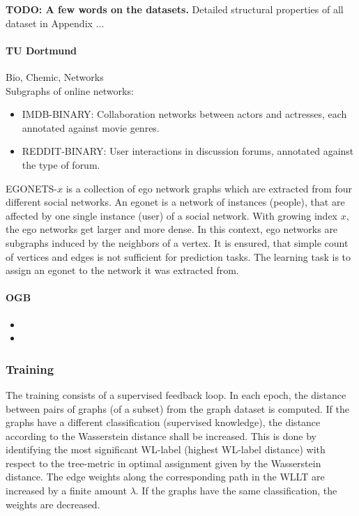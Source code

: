 \textbf{TODO: A few words on the datasets.} %
Detailed structural properties of all dataset in Appendix ... %
\paragraph{TU Dortmund} Bio, Chemic, Networks\\
Subgraphs of online networks:
\begin{itemize}
	\item IMDB-BINARY: Collaboration networks between actors and actresses, each annotated against movie genres.
	\item REDDIT-BINARY: User interactions in discussion forums, annotated against the type of forum.
\end{itemize}
EGONETS-$x$ is a collection of ego network graphs which are extracted from four different social networks. 
An egonet is a network of instances (people), that are affected by one single instance (user) of a social network.%
With growing index $x$, the ego networks get larger and more dense. 
In this context, ego networks are subgraphs induced by the neighbors of a vertex. 
It is ensured, that simple count of vertices and edges is not sufficient for prediction tasks. The learning task is to assign an egonet to the network it was extracted from.%

\paragraph{OGB} 
\begin{itemize}
	\item 
	\item 
\end{itemize}

\subsubsection{Training}

The training consists of a supervised feedback loop.
In each epoch, the distance between pairs of graphs (of a subset) from the graph dataset is computed. 
If the graphs have a different classification (supervised knowledge), the distance according to the Wasserstein distance shall be increased. 
This is done by identifying the most significant WL-label (highest WL-label distance) with respect to the tree-metric in optimal assignment given by the Wasserstein distance. 
The edge weights along the corresponding path in the WLLT are increased by a finite amount $\lambda$. 
If the graphs have the same classification, the weights are decreased.

